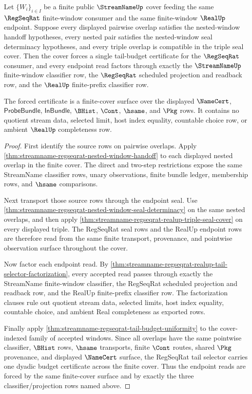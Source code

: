 \begin{theorem}
\label{thm:streamname-regseqrat-realup-cover-tail-budget-finality}
Let $\{W_i\}_{i\in I}$ be a finite public $\StreamNameUp$ cover feeding the
same $\RegSeqRat$ finite-window consumer and the same finite-window $\RealUp$
endpoint. Suppose every displayed pairwise overlap satisfies the
nested-window handoff hypotheses, every nested pair satisfies the
nested-window seal determinacy hypotheses, and every triple overlap is
compatible in the triple seal cover. Then the cover forces a single
tail-budget certificate for the $\RegSeqRat$ consumer, and every endpoint read
factors through exactly the $\StreamNameUp$ finite-window classifier row, the
$\RegSeqRat$ scheduled projection and readback row, and the $\RealUp$
finite-prefix classifier row.

The forced certificate is a finite-cover surface over the displayed
$\NameCert$, $\mathsf{ProbeBundle}$, $\mathsf{InBundle}$, $\BHist$, $\Cont$,
$\hsame$, and $\Pkg$ rows. It contains no quotient stream data, selected limit,
host index equality, countable choice row, or ambient $\RealUp$ completeness
row.
\end{theorem}
\begin{proof}
First identify the source rows on pairwise overlaps. Apply
\autoref{thm:streamname-regseqrat-nested-window-handoff} to each displayed
nested overlap in the finite cover. The direct and two-step restrictions expose
the same StreamName classifier rows, unary observations, finite bundle ledger,
membership rows, and $\hsame$ comparisons.

Next transport those source rows through the endpoint seal. Use
\autoref{thm:streamname-regseqrat-nested-window-seal-determinacy} on the same
nested overlaps, and then apply
\autoref{thm:streamname-regseqrat-realup-triple-seal-cover} on every displayed
triple. The RegSeqRat seal rows and the RealUp endpoint rows are therefore read
from the same finite transport, provenance, and pointwise observation surface
throughout the cover.

Now factor each endpoint read. By
\autoref{thm:streamname-regseqrat-realup-tail-selector-factorization}, every
accepted read passes through exactly the StreamName finite-window classifier,
the RegSeqRat scheduled projection and readback row, and the RealUp
finite-prefix classifier row. The factorization clauses rule out quotient
stream data, selected limits, host index equality, countable choice, and
ambient Real completeness as exported rows.

Finally apply
\autoref{thm:streamname-regseqrat-tail-budget-uniformity} to the cover-indexed
family of accepted windows. Since all overlaps have the same pointwise
classifier, $\BHist$ rows, $\hsame$ transports, finite $\Cont$ routes, shared
$\Pkg$ provenance, and displayed $\NameCert$ surface, the RegSeqRat tail
selector carries one dyadic budget certificate across the finite cover. Thus
the endpoint reads are forced by the same finite-cover surface and by exactly
the three classifier/projection rows named above.
\end{proof}

